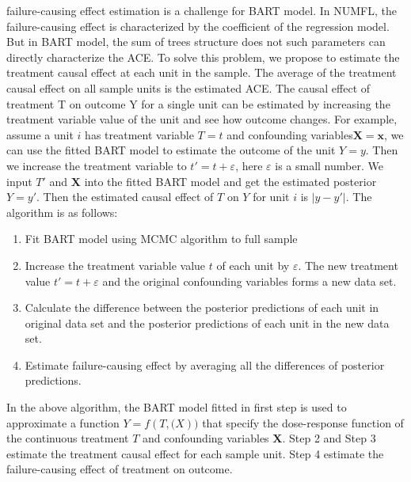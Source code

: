 failure-causing effect estimation is a challenge for BART model. In NUMFL, the failure-causing effect is characterized by the coefficient of the regression model.  But in BART model, the sum of trees structure does not such parameters can directly characterize the ACE. To solve this problem, we propose to estimate the treatment causal effect at each unit in the sample. The average of the treatment causal effect on all sample units is the estimated ACE. The causal effect of treatment T on outcome Y for a single unit can be estimated by increasing the treatment variable value of the unit and see how outcome changes. For example, assume a unit $i$ has treatment variable $T=t$ and confounding variables$\pmb {X}=\pmb {x}$, we can use the fitted BART model to estimate the outcome of the unit $Y=y$. Then we increase the treatment variable to $t'=t+\varepsilon$, here $\varepsilon $ is a small number. We input $T'$ and $\pmb{X}$ into the fitted BART model and get the estimated posterior $Y=y'$. Then the estimated causal effect of $T$ on $Y$ for unit $i$ is $\left| {y - y'} \right|$. The algorithm is as follows:
\begin{enumerate}
\item Fit BART model using MCMC algorithm to full sample
\item Increase the treatment variable value $t$ of each unit by $\varepsilon $. The new treatment value $t'=t+\varepsilon$ and the original confounding variables forms a new data set.
\item Calculate the difference between the posterior predictions of each unit in original data set and the posterior predictions of each unit in the new data set.
\item Estimate failure-causing effect by averaging all the differences of posterior predictions.
\end{enumerate}

In the above algorithm, the BART model fitted in first step is used to approximate a function $Y=f(T,\pmb(X))$ that specify the dose-response function of the continuous treatment $T$ and confounding variables $\pmb{X}$. Step 2 and Step 3 estimate the treatment causal effect for each sample unit. Step 4 estimate the failure-causing effect of treatment on outcome. 

